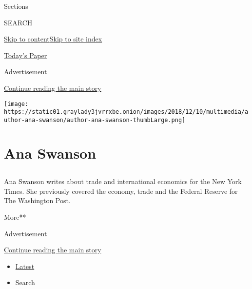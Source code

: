Sections

SEARCH

\protect\hyperlink{site-content}{Skip to
content}\protect\hyperlink{site-index}{Skip to site index}

\href{https://myaccount.nytimes3xbfgragh.onion/auth/login?response_type=cookie\&client_id=vi}{}

\href{https://www.nytimes3xbfgragh.onion/section/todayspaper}{Today's
Paper}

Advertisement

\protect\hyperlink{after-top}{Continue reading the main story}

\texttt{[image: https://static01.graylady3jvrrxbe.onion/images/2018/12/10/multimedia/author-ana-swanson/author-ana-swanson-thumbLarge.png]}

\hypertarget{ana-swanson}{%
\section{Ana Swanson}\label{ana-swanson}}

\hypertarget{section}{%
\subsection{}\label{section}}

Ana Swanson writes about trade and international economics for the New
York Times. She previously covered the economy, trade and the Federal
Reserve for The Washington Post.

More**

Advertisement

\protect\hyperlink{after-mid1}{Continue reading the main story}

\begin{itemize}
\tightlist
\item
  \protect\hyperlink{stream-panel}{Latest}
\item
  Search
\end{itemize}


